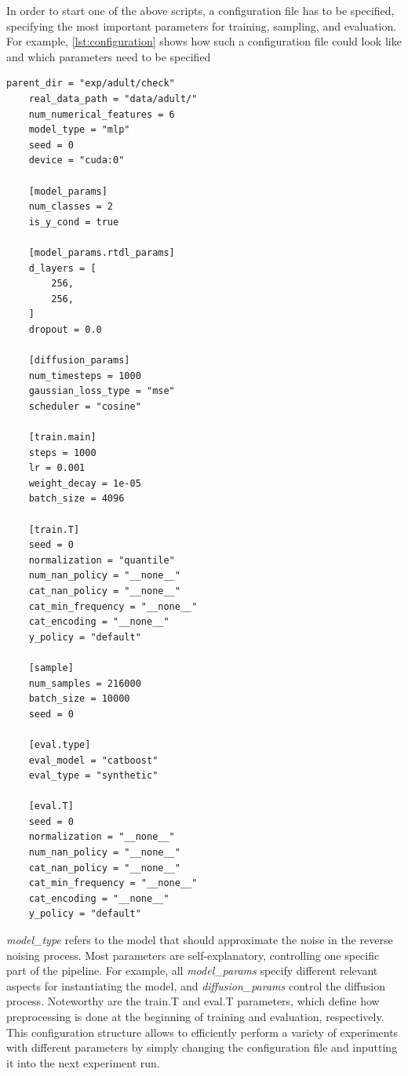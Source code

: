 In order to start one of the above scripts, a configuration file has to be specified, specifying the most important parameters for training, sampling, and evaluation.
For example, \autoref{lst:configuration} shows how such a configuration file could look like and which parameters need to be specified

\begin{lstlisting}[label={lst:configuration}, caption={Example Configuration File}]
    parent_dir = "exp/adult/check"
    real_data_path = "data/adult/"
    num_numerical_features = 6
    model_type = "mlp"
    seed = 0
    device = "cuda:0"

    [model_params]
    num_classes = 2
    is_y_cond = true

    [model_params.rtdl_params]
    d_layers = [
        256,
        256,
    ]
    dropout = 0.0

    [diffusion_params]
    num_timesteps = 1000
    gaussian_loss_type = "mse"
    scheduler = "cosine"

    [train.main]
    steps = 1000
    lr = 0.001
    weight_decay = 1e-05
    batch_size = 4096

    [train.T]
    seed = 0
    normalization = "quantile"
    num_nan_policy = "__none__"
    cat_nan_policy = "__none__"
    cat_min_frequency = "__none__"
    cat_encoding = "__none__"
    y_policy = "default"

    [sample]
    num_samples = 216000
    batch_size = 10000
    seed = 0

    [eval.type]
    eval_model = "catboost"
    eval_type = "synthetic"

    [eval.T]
    seed = 0
    normalization = "__none__"
    num_nan_policy = "__none__"
    cat_nan_policy = "__none__"
    cat_min_frequency = "__none__"
    cat_encoding = "__none__"
    y_policy = "default"
\end{lstlisting}


\textit{model\_type} refers to the model that should approximate the noise in the reverse noising process.
Most parameters are self-explanatory, controlling one specific part of the pipeline.
For example, all \textit{model\_params} specify different relevant aspects for instantiating the model, and \textit{diffusion\_params} control the diffusion process.
Noteworthy are the train.T and eval.T parameters, which define how preprocessing is done at the beginning of training and evaluation, respectively.
This configuration structure allows to efficiently perform a variety of experiments with different parameters by simply changing the configuration file and inputting it into the next experiment run.

